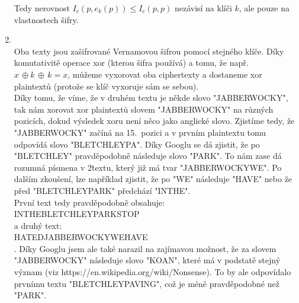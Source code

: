\documentclass[12pt]{article}
\begin{document}
\begin{enumerate}
\[		\]
		Tedy nerovnost $I_c(p,e_k(p)) \leq I_c(p,p)$ nezávisí na klíči $k$, ale pouze na vlastnostech šifry.
		\item \quad\\
		Oba texty jsou zašifrované Vernamovou šifrou pomocí stejného klíče. Díky komutativitě operace xor (kterou šifra používá) a tomu, že např. $x \, \oplus k \, \oplus \, k = x$,  můžeme vyxorovat oba ciphertexty a dostaneme xor plaintextů (protože se klíč vyxoruje sám se sebou).\\
		Díky tomu, že víme, že v druhém textu je někde slovo "JABBERWOCKY", tak nám xorovat xor plaintextů slovem "JABBERWOCKY" na různých pozicích, dokud výsledek xoru není něco jako anglické slovo. Zjistíme tedy, že "JABBERWOCKY" začíná na 15.\ pozici a v prvním plaintextu tomu odpovídá slovo "BLETCHLEYPA". Díky Googlu se dá zjistit, že po "BLETCHLEY" pravděpodobně následuje slovo "PARK". To nám zase dá rozumná písmena v 2\. textu, který již má tvar "JABBERWOCKYWE". Po dalším zkoušení, lze například zjistit, že po "WE" následuje "HAVE" nebo že před "BLETCHLEYPARK" předchází "INTHE".\\
		První text tedy pravděpodobně obsahuje:\\
		INTHEBLETCHLEYPARKSTOP\\
		a druhý text:\\
		HATEDJABBERWOCKYWEHAVE\\.
		Díky Googlu jsem ale také narazil na zajímavou možnost, že za slovem "JABBERWOCKY" následuje slovo "KOAN", které má v podstatě stejný význam (viz https://en.wikipedia.org/wiki/Nonsense). To by ale odpovídalo prvnímu textu "BLETCHLEYPAVING", což je méně pravděpodobné než "PARK".
		
	\end{enumerate}
\end{document}
